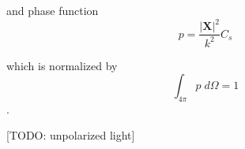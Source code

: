 and phase function 
\begin{equation}
    p = \frac{|\mathbf{X}|^2}{k^2}C_s
\end{equation}

which is normalized by $$\int_{4\pi}p\;d\Omega=1$$.






[TODO: unpolarized light]



